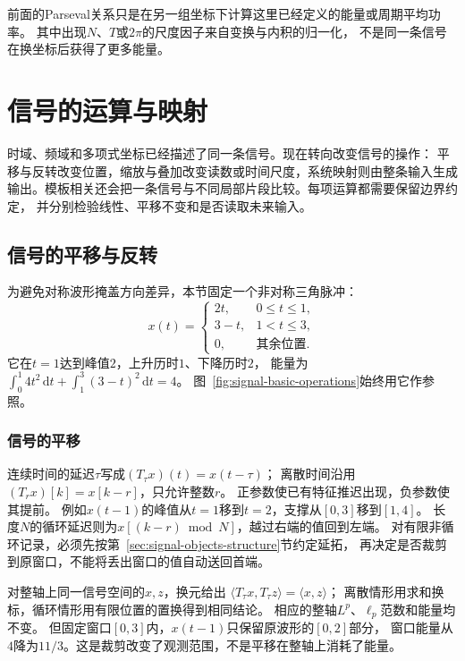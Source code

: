 前面的Parseval关系只是在另一组坐标下计算这里已经定义的能量或周期平均功率。
其中出现$N$、$T$或$2\pi$的尺度因子来自变换与内积的归一化，
不是同一条信号在换坐标后获得了更多能量。

\section{信号的运算与映射}
\label{sec:signal-operations-maps}

时域、频域和多项式坐标已经描述了同一条信号。现在转向改变信号的操作：
平移与反转改变位置，缩放与叠加改变读数或时间尺度，系统映射则由整条输入生成
输出。模板相关还会把一条信号与不同局部片段比较。每项运算都需要保留边界约定，
并分别检验线性、平移不变和是否读取未来输入。

\subsection{信号的平移与反转}

为避免对称波形掩盖方向差异，本节固定一个非对称三角脉冲：
\begin{equation}
  x(t)=
  \begin{cases}
    2t,&0\leq t\leq1,\\
    3-t,&1<t\leq3,\\
    0,&\text{其余位置}.
  \end{cases}
  \label{eq:signal-asymmetric-wave}
\end{equation}
它在$t=1$达到峰值$2$，上升历时$1$、下降历时$2$，
能量为$\int_0^1 4t^2\,\mathrm dt+\int_1^3(3-t)^2\,\mathrm dt=4$。
图~\ref{fig:signal-basic-operations}始终用它作参照。

\subsubsection{信号的平移}

连续时间的延迟$\tau$写成$(T_\tau x)(t)=x(t-\tau)$；
离散时间沿用$(T_rx)[k]=x[k-r]$，只允许整数$r$。
正参数使已有特征推迟出现，负参数使其提前。
例如$x(t-1)$的峰值从$t=1$移到$t=2$，支撑从$[0,3]$移到$[1,4]$。
长度$N$的循环延迟则为$x[(k-r)\bmod N]$，越过右端的值回到左端。
对有限非循环记录，必须先按第~\ref{sec:signal-objects-structure}节约定延拓，
再决定是否裁剪到原窗口，不能将丢出窗口的值自动送回首端。

对整轴上同一信号空间的$x,z$，换元给出
$\langle T_\tau x,T_\tau z\rangle=\langle x,z\rangle$；
离散情形用求和换标，循环情形用有限位置的置换得到相同结论。
相应的整轴$L^p$、$\ell_p$范数和能量均不变。
但固定窗口$[0,3]$内，$x(t-1)$只保留原波形的$[0,2]$部分，
窗口能量从$4$降为$11/3$。这是裁剪改变了观测范围，不是平移在整轴上消耗了能量。

